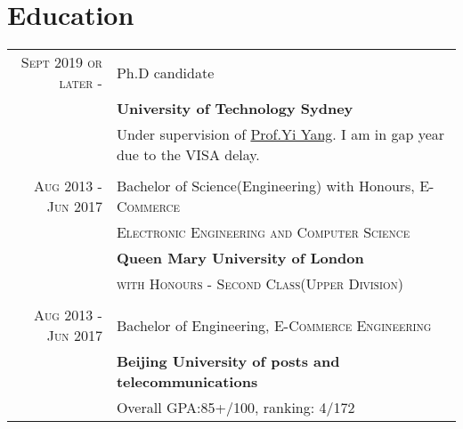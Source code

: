 \documentclass[a4paper,10pt]{article}
\begin{document}
\section{Education}
\begin{tabular}{rl}	

 \textsc{Sept 2019 or later} - \textsc{} & Ph.D candidate\\
& \textbf{University of Technology Sydney}\\
& Under supervision of \href{https://sites.google.com/site/ianyyang2016/}{Prof.Yi Yang}. I am in gap year due to the VISA delay.\\
\\
 \textsc{Aug 2013} - \textsc{Jun 2017} & Bachelor of Science(Engineering) with Honours, \textsc{E-Commerce}\\
&\textsc{Electronic Engineering and} \textsc{Computer Science}\\
& \textbf{Queen Mary University of London}\\
& \textsc{with Honours - Second Class(Upper Division)}  \\
\\

 \textsc{Aug 2013} - \textsc{Jun 2017} & Bachelor of Engineering, \textsc{E-Commerce Engineering}\\
& \textbf{Beijing University of posts and telecommunications}\\
& Overall GPA:\textsc{85+/100}, ranking: \textsc{4/172}  \\

\end{tabular}

\end{document}
